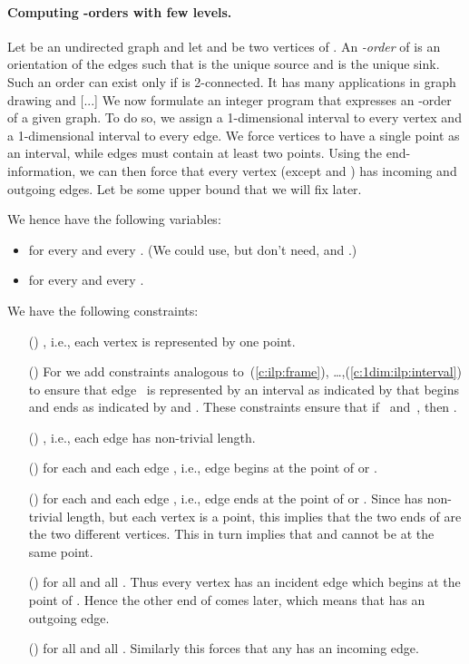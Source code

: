 \documentclass[runningheads]{llncs}
\newcounter{constr}
\newcommand{\constr}[1]{\noindent \refstepcounter{constr}\theconstr #1}
\begin{document}
\paragraph{Computing -orders with few levels.}
Let  be an undirected graph and let  and  be two vertices of
.  An {\em -order} of  is an orientation of the edges such
that  is the unique source and  is the unique sink.  Such an
order can exist only if  is 2-connected.  It has many
applications in graph drawing and [...] 
We now formulate an integer program that expresses an -order
of a given graph.  To do so, we assign a 1-dimensional interval  to 
every vertex and a 1-dimensional interval to every edge.  We force
vertices to have a single point as an interval, while edges must
contain at least two points.  Using the end-information, we can then
force that every vertex (except  and ) has incoming and outgoing
edges.  Let  be some upper bound that we will fix later.

We hence have the following variables:
\begin{itemize}
\item  for every  and every .
	(We could use, but don't need,  and .)
\item  for every  and every .
\end{itemize}
We have the following constraints:
\begin{itemize}
\item[(\constr{\label{c:1dim:st:1}})]
 , i.e., each vertex is represented by one point.
\item[(\constr{\label{c:1dim:st:2}})]
For  we add constraints analogous to~(\ref{c:ilp:frame}),
\ldots,(\ref{c:1dim:ilp:interval})
to ensure that edge~ is represented
	by an interval as indicated by  that begins and ends
	as indicated by  and .
	These constraints ensure that if~ and~,
	then .
\item[(\constr{\label{c:1dim:st:3}})]
 , i.e., each edge has non-trivial length.
\item[(\constr{\label{c:1dim:st:4}})]
  for each  and each edge ,
	i.e., edge  begins at the point of  or .
\item[(\constr{\label{c:1dim:st:5}})]
  for each  and each edge ,
	i.e., edge  ends at the point of  or .  Since  has
	non-trivial length, but each vertex is a point, this implies
	that the two ends of  are the two different vertices.  This
	in turn implies that  and  cannot be at the same point.
\item[(\constr{\label{c:1dim:st:6}})]
  for all  and all .
	Thus every vertex  has an incident edge which begins
	at the point of .  Hence the other end of  comes later,
	which means that  has an outgoing edge.
\item[(\constr{\label{c:1dim:st:7}})]
  for all  and all .
	Similarly this forces that any  has an incoming edge.
\end{itemize}
\end{document}
